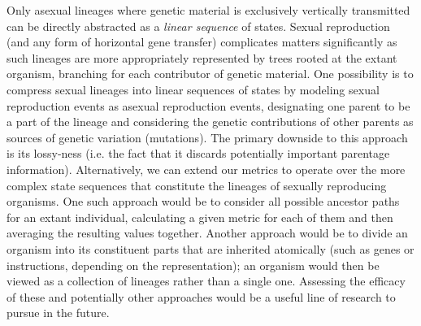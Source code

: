 \documentclass[letterpaper]{article}
\begin{document}
Only asexual lineages %
where genetic material is exclusively vertically transmitted can be directly abstracted as a \textit{linear sequence} of states.
Sexual reproduction (and any form of horizontal gene transfer) complicates matters significantly as such lineages are more appropriately represented by trees rooted at the extant organism, branching for each contributor of genetic material. 
One possibility is to compress sexual lineages into linear sequences of states by modeling sexual reproduction events as asexual reproduction events, designating one parent to be a part of the lineage and considering the genetic contributions of other parents as sources of genetic variation (mutations). The primary downside to this approach is its lossy-ness (i.e. the fact that it discards potentially important parentage information). 
Alternatively, we can extend our metrics to operate over the more complex state sequences that constitute the lineages of sexually reproducing organisms. One such approach would be to consider all possible ancestor paths for an extant individual, calculating a given metric for each of them and then averaging the resulting values together. Another approach would be to divide an organism into its constituent parts that are inherited atomically (such as genes or instructions, depending on the representation); an organism would then be viewed as a collection of lineages rather than a single one. 
Assessing the efficacy of these and potentially other approaches would be a useful line of research to pursue in the future.
\end{document}
